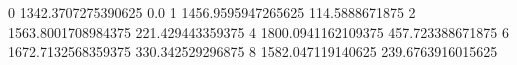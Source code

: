 0 1342.3707275390625 0.0
1 1456.9595947265625 114.5888671875
2 1563.8001708984375 221.429443359375
4 1800.0941162109375 457.723388671875
6 1672.7132568359375 330.342529296875
8 1582.047119140625 239.6763916015625
